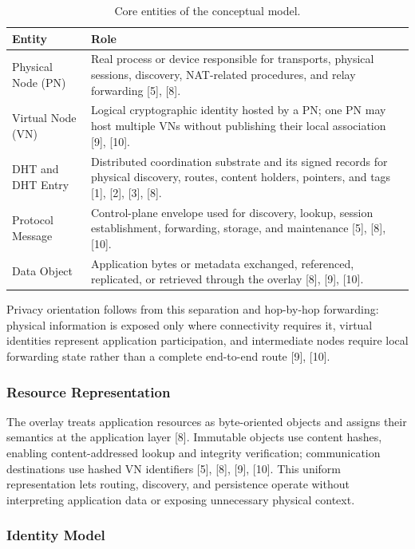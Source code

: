 \documentclass[12pt,a4paper]{article}
\begin{document}
\begin{table}[H]
\centering
\caption{Core entities of the conceptual model.}
\label{tab:conceptual-entities}
\begin{tabularx}{\textwidth}{L{0.22\textwidth} Y}
\toprule
\textbf{Entity} & \textbf{Role} \\
\midrule
Physical Node (PN) & Real process or device responsible for transports, physical sessions, discovery, NAT-related procedures, and relay forwarding [5], [8]. \\
Virtual Node (VN) & Logical cryptographic identity hosted by a PN; one PN may host multiple VNs without publishing their local association [9], [10]. \\
DHT and DHT Entry & Distributed coordination substrate and its signed records for physical discovery, routes, content holders, pointers, and tags [1], [2], [3], [8]. \\
Protocol Message & Control-plane envelope used for discovery, lookup, session establishment, forwarding, storage, and maintenance [5], [8], [10]. \\
Data Object & Application bytes or metadata exchanged, referenced, replicated, or retrieved through the overlay [8], [9], [10]. \\
\bottomrule
\end{tabularx}
\end{table}

Privacy orientation follows from this separation and hop-by-hop forwarding: physical information is exposed only where connectivity requires it, virtual identities represent application participation, and intermediate nodes require local forwarding state rather than a complete end-to-end route [9], [10].


\subsubsection{Resource Representation}

The overlay treats application resources as byte-oriented objects and assigns their semantics at the application layer [8]. Immutable objects use content hashes, enabling content-addressed lookup and integrity verification; communication destinations use hashed VN identifiers [5], [8], [9], [10]. This uniform representation lets routing, discovery, and persistence operate without interpreting application data or exposing unnecessary physical context.

\subsubsection{Identity Model}
\end{document}
